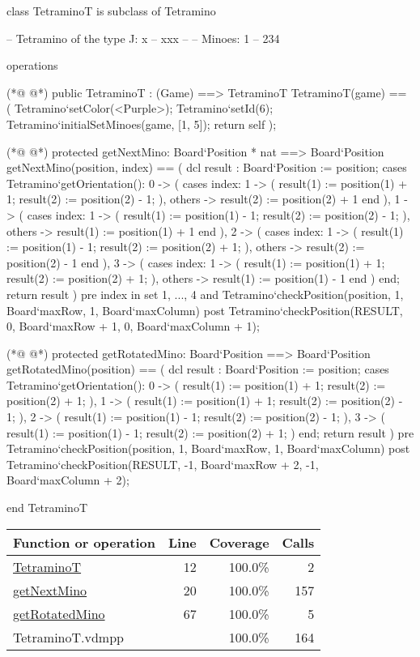 \begin{vdmpp}[breaklines=true]
class TetraminoT is subclass of Tetramino
  
 -- Tetramino of the type J:  x
 --       xxx
 --
 -- Minoes:        1
 --         234
 

 operations
 
(*@
\label{TetraminoT:12}
@*)
  public TetraminoT : (Game) ==> TetraminoT
  TetraminoT(game) == (
   Tetramino`setColor(<Purple>);
   Tetramino`setId(6);
   Tetramino`initialSetMinoes(game, [1, 5]);
   return self
  );

(*@
\label{getNextMino:20}
@*)
  protected getNextMino: Board`Position * nat ==> Board`Position
  getNextMino(position, index) == (
   dcl result : Board`Position := position;
   cases Tetramino`getOrientation():
    0 -> (
     cases index:
      1 -> (
       result(1) := position(1) + 1;
       result(2) := position(2) - 1;
      ),
      others -> result(2) := position(2) + 1
     end
    ),
    1 -> (
     cases index:
      1 -> (
       result(1) := position(1) - 1;
       result(2) := position(2) - 1;
      ),
      others -> result(1) := position(1) + 1
     end
    ),
    2 -> (
     cases index:
      1 -> (
       result(1) := position(1) - 1;
       result(2) := position(2) + 1;
      ),
      others -> result(2) := position(2) - 1
     end
    ),
    3 -> (
     cases index:
      1 -> (
       result(1) := position(1) + 1;
       result(2) := position(2) + 1;
      ),
      others -> result(1) := position(1) - 1
     end
    )
   end;
   return result
  )
  pre index in set {1, ..., 4} 
   and Tetramino`checkPosition(position, 1, Board`maxRow, 1, Board`maxColumn)
  post Tetramino`checkPosition(RESULT, 0, Board`maxRow + 1, 0, Board`maxColumn + 1);
  
(*@
\label{getRotatedMino:67}
@*)
  protected getRotatedMino: Board`Position ==> Board`Position
  getRotatedMino(position) == (
   dcl result : Board`Position := position;
   cases Tetramino`getOrientation():
    0 -> (
     result(1) := position(1) + 1; 
     result(2) := position(2) + 1;
     ),
    1 -> (
     result(1) := position(1) + 1; 
     result(2) := position(2) - 1;
     ),
    2 -> (
     result(1) := position(1) - 1; 
     result(2) := position(2) - 1;
     ),
    3 -> (
     result(1) := position(1) - 1; 
     result(2) := position(2) + 1;
     )
   end;
   return result
  )
  pre Tetramino`checkPosition(position, 1, Board`maxRow, 1, Board`maxColumn)
  post Tetramino`checkPosition(RESULT, -1, Board`maxRow + 2, -1, Board`maxColumn + 2);

end TetraminoT
\end{vdmpp}
\bigskip
\begin{longtable}{|l|r|r|r|}
\hline
Function or operation & Line & Coverage & Calls \\
\hline
\hline
\hyperref[TetraminoT:12]{TetraminoT} & 12&100.0\% & 2 \\
\hline
\hyperref[getNextMino:20]{getNextMino} & 20&100.0\% & 157 \\
\hline
\hyperref[getRotatedMino:67]{getRotatedMino} & 67&100.0\% & 5 \\
\hline
\hline
TetraminoT.vdmpp & & 100.0\% & 164 \\
\hline
\end{longtable}

